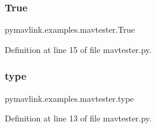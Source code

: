 \subsubsection{\texorpdfstring{True}{True}}
{\footnotesize\ttfamily pymavlink.\+examples.\+mavtester.\+True}



Definition at line 15 of file mavtester.\+py.

\mbox{\label{namespacepymavlink_1_1examples_1_1mavtester_a85d6cc5180b6d3cf95f36b44a8dcf832}} 
\subsubsection{\texorpdfstring{type}{type}}
{\footnotesize\ttfamily pymavlink.\+examples.\+mavtester.\+type}



Definition at line 13 of file mavtester.\+py.

